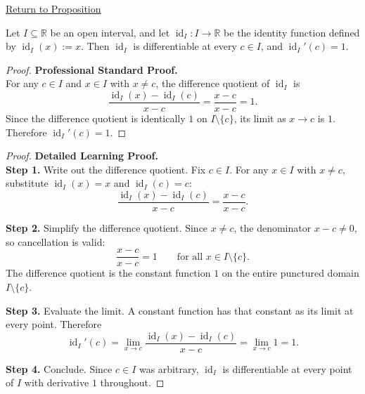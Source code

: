 \newpage
{}
\label{prf:derivative-of-the-identity}

\begin{remark*}[Return]
\hyperref[prop:derivative-of-the-identity]{Return to Proposition}
\end{remark*}

\begin{theorem*}
Let $I \subseteq \mathbb{R}$ be an open interval, and let $\operatorname{id}_I : I \to \mathbb{R}$ be the identity function defined by $\operatorname{id}_I(x) := x$. Then $\operatorname{id}_I$ is differentiable at every $c \in I$, and $\operatorname{id}_I'(c) = 1$.
\end{theorem*}

\begin{proof}
\textbf{Professional Standard Proof.}~\\
For any $c \in I$ and $x \in I$ with $x \neq c$, the difference quotient of $\operatorname{id}_I$ is
\[
\frac{\operatorname{id}_I(x) - \operatorname{id}_I(c)}{x - c} = \frac{x - c}{x - c} = 1.
\]
Since the difference quotient is identically $1$ on $I \setminus \{c\}$, its limit as $x \to c$ is $1$. Therefore $\operatorname{id}_I'(c) = 1$.
\end{proof}

\begin{proof}
\textbf{Detailed Learning Proof.}~\\

\textbf{Step 1.} Write out the difference quotient. Fix $c \in I$. For any $x \in I$ with $x \neq c$, substitute $\operatorname{id}_I(x) = x$ and $\operatorname{id}_I(c) = c$:
\[
\frac{\operatorname{id}_I(x) - \operatorname{id}_I(c)}{x - c} = \frac{x - c}{x - c}.
\]

\textbf{Step 2.} Simplify the difference quotient. Since $x \neq c$, the denominator $x - c \neq 0$, so cancellation is valid:
\[
\frac{x - c}{x - c} = 1 \qquad \text{for all } x \in I \setminus \{c\}.
\]
The difference quotient is the constant function $1$ on the entire punctured domain $I \setminus \{c\}$.

\textbf{Step 3.} Evaluate the limit. A constant function has that constant as its limit at every point. Therefore
\[
\operatorname{id}_I'(c) = \lim_{x \to c} \frac{\operatorname{id}_I(x) - \operatorname{id}_I(c)}{x - c} = \lim_{x \to c} 1 = 1.
\]

\textbf{Step 4.} Conclude. Since $c \in I$ was arbitrary, $\operatorname{id}_I$ is differentiable at every point of $I$ with derivative $1$ throughout.
\end{proof}

